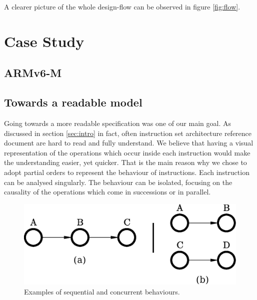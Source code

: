 \documentclass[conference]{IEEEtran}
\begin{document}
A clearer picture of the whole design-flow can be observed in figure \ref{fig:flow}.


\section{Case Study}
\label{sec:arm}

\subsection{ARMv6-M}

\subsection{Towards a readable model}
Going towards a more readable specification was one of our main goal. As discussed in section
\ref{sec:intro} in fact, often instruction set architecture reference document are hard to
read and fully understand. We believe that having a visual representation of the operations
which occur inside each instruction would make the understanding easier, yet quicker. That is
the main reason why we chose to adopt partial orders to represent the behaviour of
instructions. Each instruction can be analysed singularly. The behaviour can be isolated,
focusing on the causality of the operations which come in successions or in parallel.

\begin{figure}[ht!]
\begin{center}
	\includegraphics[scale=0.5]{IMG/pos.eps}
	\caption{Examples of sequential and concurrent behaviours.}
	\label{fig:pos}
\end{center}
\end{figure}
\end{document}
